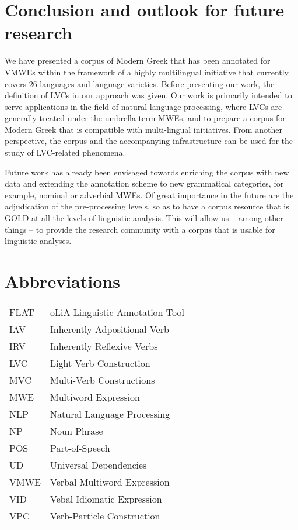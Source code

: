 \documentclass[output=paper,colorlinks,citecolor=brown]{langscibook}
\begin{document}
\section{Conclusion and outlook for future research}
\label{sec:conclusion}
We have presented a corpus of Modern Greek that has been annotated for VMWEs within the framework of a highly multilingual initiative that currently covers 26 languages and language varieties. Before presenting our work, the definition of LVCs in our approach was given. 
Our work is primarily intended to serve applications in the field of natural language processing, where LVCs are generally treated under the umbrella term MWEs, and to prepare a corpus for Modern Greek that is compatible with multi-lingual initiatives.
From another perspective, the corpus and the accompanying infrastructure can be used for the study of LVC-related phenomena.

Future work has already been envisaged towards enriching the corpus with new data and extending the annotation scheme to new grammatical categories, for example, nominal or adverbial MWEs. Of great importance in the future are the adjudication of the pre-processing levels, so as to have a corpus resource that is GOLD at all the levels of linguistic analysis. This will allow us -- among other things -- to provide the research community with a corpus that is usable for linguistic analyses.


\section*{Abbreviations}
\begin{tabularx}{.85\textwidth}{lQ}
FLAT & oLiA Linguistic Annotation Tool \\
IAV & Inherently Adpositional Verb \\
IRV & Inherently Reflexive Verbs \\
LVC & Light Verb Construction \\
MVC & Multi-Verb Constructions \\
MWE & Multiword Expression \\
NLP & Natural Language Processing \\
NP & Noun Phrase \\
POS & Part-of-Speech \\
UD & Universal Dependencies \\
VMWE & Verbal Multiword Expression \\
VID & Vebal Idiomatic Expression \\
VPC & Verb-Particle Construction \\
\end{tabularx}
\end{document}
